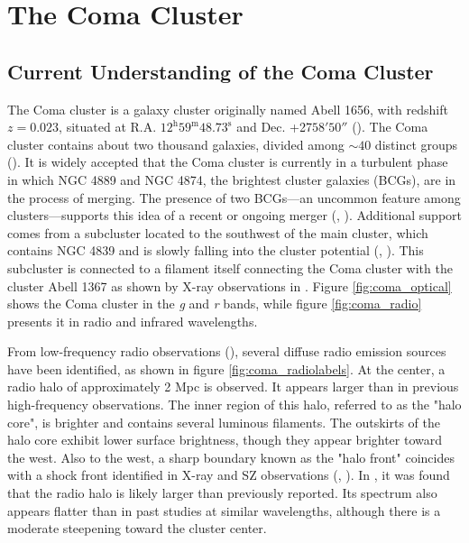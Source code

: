 \documentclass[11pt,letterpaper]{article}
\begin{document}
\section{The Coma Cluster} \label{sec:coma_cluster}
\subsection{Current Understanding of the Coma Cluster} \label{sec:coma_cluster_what}
The Coma cluster is a galaxy cluster originally named Abell 1656, with redshift $z = 0.023$, situated at R.A. $12^{\text{h}}59^{\text{m}}48.73^{\text{s}}$ and Dec. +27\textdegree $58'50''$ (\cite{bilton_kinematics_2018}). The Coma cluster contains about two thousand galaxies, divided among $\sim 40$ distinct groups (\cite{jimenez-teja_deep_2024}). It is widely accepted that the Coma cluster is currently in a turbulent phase in which NGC 4889 and NGC 4874, the brightest cluster galaxies (BCGs), are in the process of merging. The presence of two BCGs—an uncommon feature among clusters—supports this idea of a recent or ongoing merger (\cite{jimenez-teja_deep_2024}, \cite{simionescu_thermodynamics_2013}). Additional support comes from a subcluster located to the southwest of the main cluster, which contains NGC 4839 and is slowly falling into the cluster potential (\cite{jimenez-teja_deep_2024}, \cite{simionescu_thermodynamics_2013}). This subcluster is connected to a filament itself connecting the Coma cluster with the cluster Abell 1367 as shown by X-ray observations in \cite{mirakhor_complete_2020}. Figure \ref{fig:coma_optical} shows the Coma cluster in the \textit{g} and \textit{r} bands, while figure \ref{fig:coma_radio} presents it in radio and infrared wavelengths.

\medskip
\par From low-frequency radio observations (\cite{bonafede_coma_2022-1}), several diffuse radio emission sources have been identified, as shown in figure \ref{fig:coma_radiolabels}. At the center, a radio halo of approximately 2 Mpc is observed. It appears larger than in previous high-frequency observations. The inner region of this halo, referred to as the "halo core", is brighter and contains several luminous filaments. The outskirts of the halo core exhibit lower surface brightness, though they appear brighter toward the west. Also to the west, a sharp boundary known as the "halo front" coincides with a shock front identified in X-ray and SZ observations (\cite{simionescu_thermodynamics_2013}, \cite{planck_collaboration_planck_2013}). In \cite{bonafede_coma_2022-1}, it was found that the radio halo is likely larger than previously reported. Its spectrum also appears flatter than in past studies at similar wavelengths, although there is a moderate steepening toward the cluster center.
\end{document}
